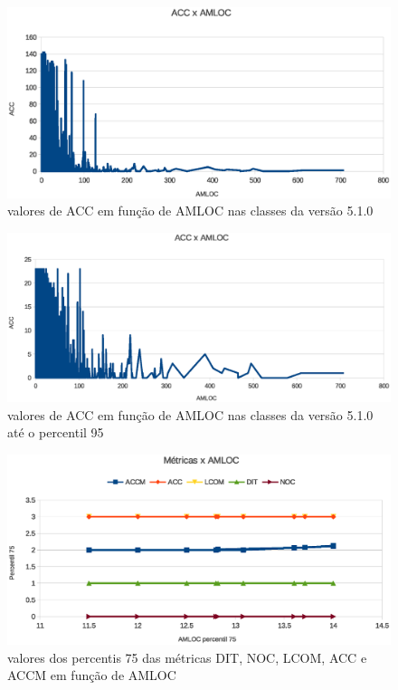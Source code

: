 \begin{figure}[!htb]
\centering
\includegraphics [keepaspectratio=true,scale=0.7]{figuras/accxamloc510.eps}
\caption{valores de ACC em função de AMLOC nas classes da versão 5.1.0}
\label{fig:accxamloc510}
\end{figure}


\begin{figure}[!htb]
\centering
\includegraphics [keepaspectratio=true,scale=0.7]{figuras/accxamloc51095.eps}
\caption{valores de ACC em função de AMLOC nas classes da versão 5.1.0 até o percentil 95}
\label{fig:accxamloc51095}
\end{figure}

\begin{figure}[!htb]
\centering
\includegraphics [keepaspectratio=true,scale=0.7]{figuras/metricasxamloc.eps}
\caption{valores dos percentis 75 das métricas DIT, NOC, LCOM, ACC e ACCM em função de AMLOC}
\label{fig:metricasxamloc}
\end{figure}

